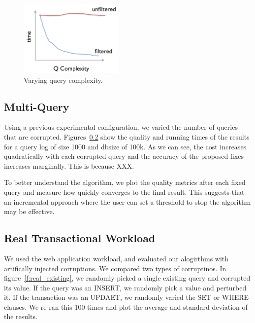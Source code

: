 \begin{figure}[h]
\centering
\includegraphics[width = 2in]{figures/complete_qfilter_complexity}
\caption{Varying query complexity.}
\label{f:complete_qfilter_complexity} 
\end{figure}



\subsection{Multi-Query}

Using a previous experimental configuration, we varied the number of queries that are corrupted.  Figures~\ref{}
show the quality and running times of the results for a query log of size 1000 and dbsize of 100k.  
As we can see, the cost increases quadratically with each corrupted query and the accuracy of the proposed fixes increases marginally.  
This is because XXX.


To better understand the algorithm, we plot the quality metrics after each fixed query and measure how quickly \sys converges to the final result. 
This suggests that an incremental approach where the user can set a threshold to stop the algorithm may be effective.


\subsection{Real Transactional Workload}

We used the web application workload, and evaluated our alogirthms with artifically injected corruptions.
We compared two types of corruptinos.  In figure~\ref{f:real_existing}, we randomly picked a single existing 
query and corrupted its value.  If the query was an INSERT, we randomly pick a value and perturbed it.
If the transaction was an UPDAET, we randomly varied the SET or WHERE clauses.   We re-ran this
100 times and plot the average and standard deviation of the results.

